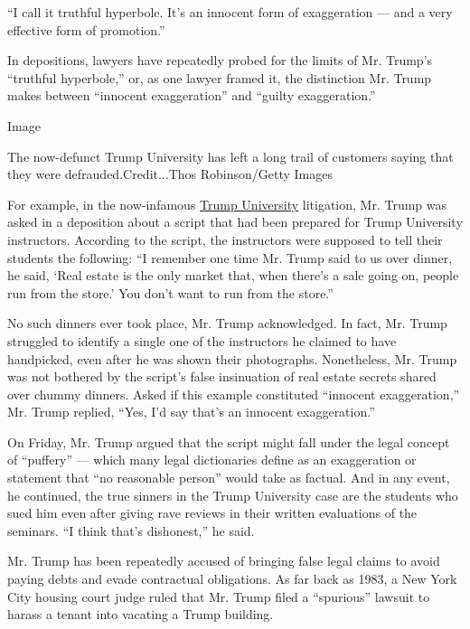 ``I call it truthful hyperbole. It's an innocent form of exaggeration
--- and a very effective form of promotion.''

In depositions, lawyers have repeatedly probed for the limits of Mr.
Trump's ``truthful hyperbole,'' or, as one lawyer framed it, the
distinction Mr. Trump makes between ``innocent exaggeration'' and
``guilty exaggeration.''

Image

The now-defunct Trump University has left a long trail of customers
saying that they were defrauded.Credit...Thos Robinson/Getty Images

For example, in the now-infamous
\href{http://www.nytimes3xbfgragh.onion/2016/06/01/us/politics/donald-trump-university.html}{Trump
University} litigation, Mr. Trump was asked in a deposition about a
script that had been prepared for Trump University instructors.
According to the script, the instructors were supposed to tell their
students the following: ``I remember one time Mr. Trump said to us over
dinner, he said, `Real estate is the only market that, when there's a
sale going on, people run from the store.' You don't want to run from
the store.''

No such dinners ever took place, Mr. Trump acknowledged. In fact, Mr.
Trump struggled to identify a single one of the instructors he claimed
to have handpicked, even after he was shown their photographs.
Nonetheless, Mr. Trump was not bothered by the script's false
insinuation of real estate secrets shared over chummy dinners. Asked if
this example constituted ``innocent exaggeration,'' Mr. Trump replied,
``Yes, I'd say that's an innocent exaggeration.''

On Friday, Mr. Trump argued that the script might fall under the legal
concept of ``puffery'' --- which many legal dictionaries define as an
exaggeration or statement that ``no reasonable person'' would take as
factual. And in any event, he continued, the true sinners in the Trump
University case are the students who sued him even after giving rave
reviews in their written evaluations of the seminars. ``I think that's
dishonest,'' he said.

Mr. Trump has been repeatedly accused of bringing false legal claims to
avoid paying debts and evade contractual obligations. As far back as
1983, a New York City housing court judge ruled that Mr. Trump filed a
``spurious'' lawsuit to harass a tenant into vacating a Trump building.

